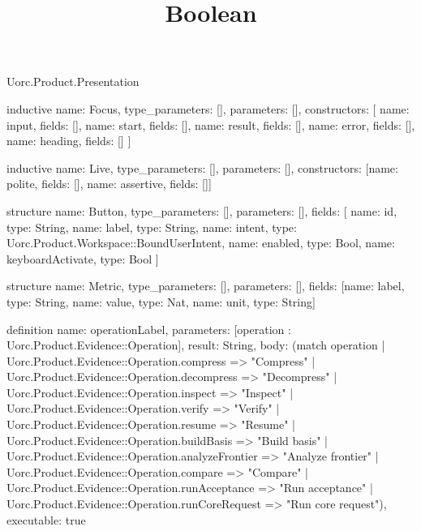 \begin{lexlean}{Uorc.Product.Presentation}
\title{Boolean}
\begin{semanticmodule}
inductive{
  name: Focus,
  type_parameters: [],
  parameters: [],
  constructors: [
    {name: input, fields: []},
    {name: start, fields: []},
    {name: result, fields: []},
    {name: error, fields: []},
    {name: heading, fields: []}
  ]
}

inductive{
  name: Live,
  type_parameters: [],
  parameters: [],
  constructors: [{name: polite, fields: []}, {name: assertive, fields: []}]
}

structure{
  name: Button,
  type_parameters: [],
  parameters: [],
  fields: [
    {name: id, type: String},
    {name: label, type: String},
    {name: intent, type: Uorc.Product.Workspace::BoundUserIntent},
    {name: enabled, type: Bool},
    {name: keyboardActivate, type: Bool}
  ]
}

structure{
  name: Metric,
  type_parameters: [],
  parameters: [],
  fields: [{name: label, type: String}, {name: value, type: Nat}, {name: unit, type: String}]
}

definition{
  name: operationLabel,
  parameters: [operation : Uorc.Product.Evidence::Operation],
  result: String,
  body: (match operation
    | Uorc.Product.Evidence::Operation.compress => "Compress"
    | Uorc.Product.Evidence::Operation.decompress => "Decompress"
    | Uorc.Product.Evidence::Operation.inspect => "Inspect"
    | Uorc.Product.Evidence::Operation.verify => "Verify"
    | Uorc.Product.Evidence::Operation.resume => "Resume"
    | Uorc.Product.Evidence::Operation.buildBasis => "Build basis"
    | Uorc.Product.Evidence::Operation.analyzeFrontier => "Analyze frontier"
    | Uorc.Product.Evidence::Operation.compare => "Compare"
    | Uorc.Product.Evidence::Operation.runAcceptance => "Run acceptance"
    | Uorc.Product.Evidence::Operation.runCoreRequest => "Run core request"),
  executable: true
}


\end{semanticmodule}
\end{lexlean}
